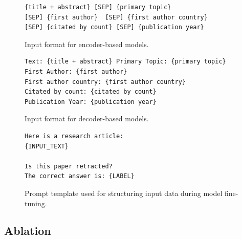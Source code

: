 \documentclass[pdflatex,sn-mathphys-num]{sn-jnl}%
\begin{document}
 








\begin{figure}[h]
\begin{tcolorbox}[colback=lightgray!5!white,colframe=black,title=INPUT_TEXT Formation]
\begin{verbatim}
{title + abstract} [SEP] {primary topic}
[SEP] {first author}  [SEP] {first author country} 
[SEP] {citated by count} [SEP] {publication year}
\end{verbatim}
\end{tcolorbox}
\caption{Input format for encoder-based models.}
\label{fig:encoder_input_template}
\end{figure}


\begin{figure}[h]
\begin{tcolorbox}[colback=lightgray!5!white,colframe=black,title=INPUT_TEXT Formation]
\begin{verbatim}
Text: {title + abstract} Primary Topic: {primary topic}
First Author: {first author} 
First author country: {first author country} 
Citated by count: {citated by count} 
Publication Year: {publication year}
\end{verbatim}
\end{tcolorbox}
\caption{Input format for decoder-based models.}
\label{fig:llm_input_template}
\end{figure}


\begin{figure}[h]
\begin{tcolorbox}[colback=lightgray!5!white,colframe=black,title=Prompt Template]
\begin{verbatim}
Here is a research article:
{INPUT_TEXT}

Is this paper retracted?
The correct answer is: {LABEL}
\end{verbatim}
\end{tcolorbox}
\caption{Prompt template used for structuring input data during model fine-tuning.}
\label{fig:prompt_template}
\end{figure}




\subsection{Ablation}
\end{document}
